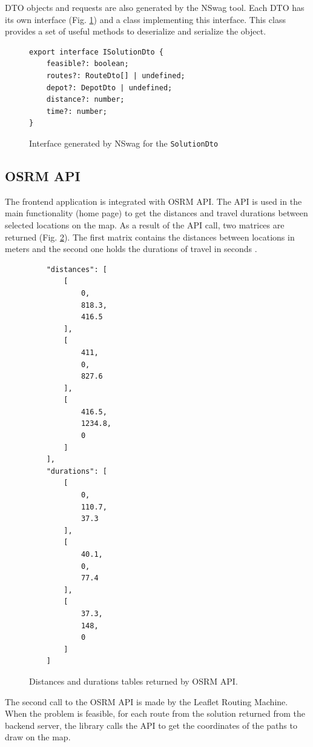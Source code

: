 \documentclass[a4paper,twoside,12pt]{book}
\begin{document}
DTO objects and requests are also generated by the NSwag tool. Each DTO has its own interface (Fig. \ref{fig:dtoInterface}) and a class implementing this interface. This class provides a set of useful methods to deserialize and serialize the object. 

\begin{figure}[H]
\centering
\begin{lstlisting}
export interface ISolutionDto {
    feasible?: boolean;
    routes?: RouteDto[] | undefined;
    depot?: DepotDto | undefined;
    distance?: number;
    time?: number;
}
\end{lstlisting}
\caption{Interface generated by NSwag for the \lstinline{SolutionDto}}
\label{fig:dtoInterface}
\end{figure}

\subsection{OSRM API}

The frontend application is integrated with OSRM API. The API is used in the main functionality (home page) to get the distances and travel durations between selected locations on the map. As a result of the API call, two matrices are returned (Fig. \ref{fig:osrmAPI}). The first matrix contains the distances between locations in meters and the second one holds the durations of travel in seconds \cite{bib:osrmAPI}. 

\begin{figure}
\centering
\begin{lstlisting}
    "distances": [
        [
            0,
            818.3,
            416.5
        ],
        [
            411,
            0,
            827.6
        ],
        [
            416.5,
            1234.8,
            0
        ]
    ],
    "durations": [
        [
            0,
            110.7,
            37.3
        ],
        [
            40.1,
            0,
            77.4
        ],
        [
            37.3,
            148,
            0
        ]
    ]
\end{lstlisting}
\caption{Distances and durations tables returned by OSRM API.}
\label{fig:osrmAPI}
\end{figure}

The second call to the OSRM API is made by the Leaflet Routing Machine. When the problem is feasible, for each route from the solution returned from the backend server, the library calls the API to get the coordinates of the paths to draw on the map. 
\end{document}
